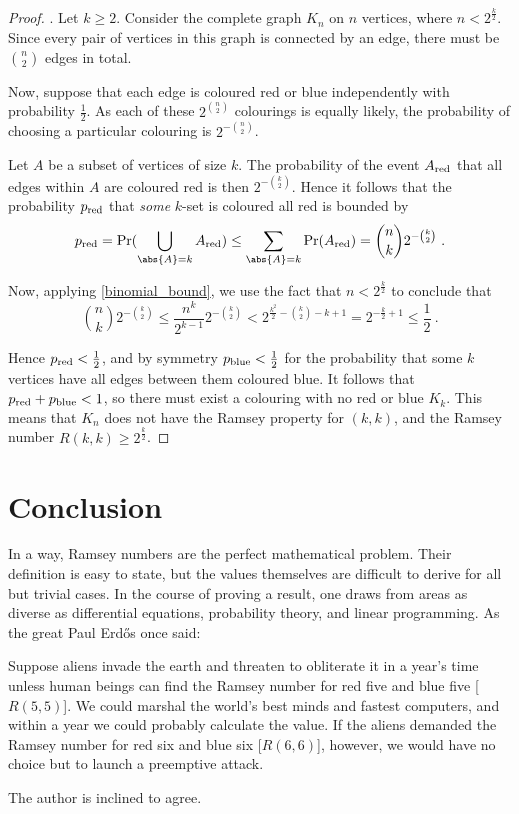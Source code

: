 \documentclass{article}
\begin{document}
\begin{proof}\citep{aigner2010proofs}.
    Let $k \geq 2$. Consider the complete graph $K_n$ on $n$ vertices, where $n < 2^{\frac k 2}$. Since every pair of vertices in this graph is connected by an edge, there must be $n \choose 2$ edges in total.

    Now, suppose that each edge is coloured red or blue independently with probability $\frac 1 2$. As each of these $2^{n \choose 2}$ colourings is equally likely, the probability of choosing a particular colouring is $2^{-{n \choose 2}}$.

    Let $A$ be a subset of vertices of size $k$. The probability of the event $A_{\mathrm{red}}$ that all edges within $A$ are coloured red is then $2^{-{k \choose 2}}$. Hence it follows that the probability $p_{\mathrm{red}}$ that \emph{some} $k$-set is coloured all red is bounded by
    \[
        p_\red = \Pr(\bigcup_{\abs{A} = k} A_\red)
        \leq \sum_{\abs{A} = k} \Pr(A_\red)
        = {n \choose k} 2^{-{k \choose 2}} \ .
    \]

Now, applying \cref{binomial_bound}, we use the fact that $n < 2^{\frac k 2}$ to conclude that
    \[
        {n \choose k} 2^{-{k \choose 2}}
        \leq \frac{n^k}{2^{k-1}} 2^{-{k \choose 2}}
        < 2^{\frac{k^2}{2} - {k \choose 2} - k + 1}
        = 2^{-\frac k 2 + 1}
        \leq \frac 1 2 \ .
    \]

Hence $p_{\mathrm{red}} < \frac 1 2$, and by symmetry $p_{\mathrm{blue}} < \frac 1 2$ for the probability that some $k$ vertices have all edges between them coloured blue. It follows that $p_{\mathrm{red}} + p_{\mathrm{blue}} < 1$, so there must exist a colouring with no red or blue $K_k$. This means that $K_n$ does not have the Ramsey property for $(k, k)$, and the Ramsey number $R(k,k) \geq 2^{\frac k 2}$.
\end{proof}

\section{Conclusion}

In a way, Ramsey numbers are the perfect mathematical problem. Their definition is easy to state, but the values themselves are difficult to derive for all but trivial cases. In the course of proving a result, one draws from areas as diverse as differential equations, probability theory, and linear programming. As the great Paul Erdős once said:

\begin{displayquote}
    Suppose aliens invade the earth and threaten to obliterate it in a year's time unless human beings can find the Ramsey number for red five and blue five [$R(5,5)$]. We could marshal the world's best minds and fastest computers, and within a year we could probably calculate the value. If the aliens demanded the Ramsey number for red six and blue six [$R(6,6)$], however, we would have no choice but to launch a preemptive attack.
\end{displayquote}

The author is inclined to agree.



\end{document}
